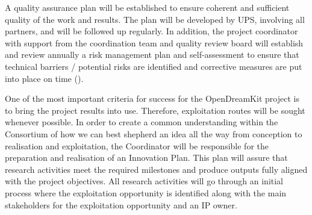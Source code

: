 \begin{workpackage}
\begin{tasklist}
\begin{task}[title=Quality assurance and risk management,id=project-quality-management,
  wphases=6-48!.3,
  lead=PS,PM=15,partners={LL,UV,UJF,UB,UO,USH,USO,SA,UW,JU,UK,US,ZH,SR,UG,FAU,XFEL},issue=15]
  A quality assurance plan will be established to ensure coherent and
  sufficient quality of the work and results. The plan will be
  developed by UPS, involving all partners, and will be followed up
  regularly. In addition, the project coordinator with support from
  the coordination team and quality review board will establish and
  review annually a risk management plan and self-assessment to ensure
  that technical barriers / potential risks are identified and
  corrective measures are put into place on time
  ().
\end{task}

\begin{task}[title=Innovation management,wphases=6-48!.2,
  id=project-innovation-management,lead=PS,PM=10,
  partners={LL,UV,UJF,UB,UO,USH,USO,SA,UW,JU,UK,US,ZH,SR,UG,FAU,XFEL},issue=16] One of the
  most important criteria for success for the OpenDreamKit project is
  to bring the project results into use. Therefore, exploitation
  routes will be sought whenever possible. In order to create a common
  understanding within the Consortium of how we can best shepherd an
  idea all the way from conception to realisation and
  exploitation, the Coordinator will be responsible for the
  preparation and realisation of an Innovation Plan. This plan will assure that
  research activities meet the required milestones and produce outputs
  fully aligned with the project objectives.  All
  research activities will go through an initial process where the
  exploitation opportunity is identified along with the main
  stakeholders for the exploitation opportunity and an IP owner.
\end{task}
\end{tasklist}

%



\end{workpackage}
